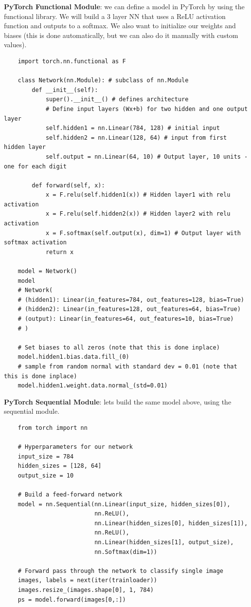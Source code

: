\documentclass[11pt, a4paper]{article}
\begin{document}
\begin{spacing}{1.1}
	\noindent \textbf{PyTorch Functional Module}: we can define a model in PyTorch by using the functional library. We will build a 3 layer NN that uses a ReLU activation function and outputs to a softmax. We also want to initialize our weights and biases (this is done automatically, but we can also do it manually with custom values).
	\begin{lstlisting}
	import torch.nn.functional as F
	
	class Network(nn.Module): # subclass of nn.Module
		def __init__(self):
			super().__init__() # defines architecture
			# Define input layers (Wx+b) for two hidden and one output layer
			self.hidden1 = nn.Linear(784, 128) # initial input
			self.hidden2 = nn.Linear(128, 64) # input from first hidden layer
			self.output = nn.Linear(64, 10) # Output layer, 10 units - one for each digit
		
		def forward(self, x):
			x = F.relu(self.hidden1(x)) # Hidden layer1 with relu activation
			x = F.relu(self.hidden2(x)) # Hidden layer2 with relu activation
			x = F.softmax(self.output(x), dim=1) # Output layer with softmax activation
			return x
	
	model = Network()
	model
	# Network(
	# (hidden1): Linear(in_features=784, out_features=128, bias=True)
	# (hidden2): Linear(in_features=128, out_features=64, bias=True)
	# (output): Linear(in_features=64, out_features=10, bias=True)
	# )
	
	# Set biases to all zeros (note that this is done inplace)
	model.hidden1.bias.data.fill_(0)
	# sample from random normal with standard dev = 0.01 (note that this is done inplace)
	model.hidden1.weight.data.normal_(std=0.01)	
	\end{lstlisting} \vspace*{1mm}
	\textbf{PyTorch Sequential Module}: lets build the same model above, using the sequential module.
	\begin{lstlisting}
	from torch import nn
	
	# Hyperparameters for our network
	input_size = 784
	hidden_sizes = [128, 64]
	output_size = 10
	
	# Build a feed-forward network
	model = nn.Sequential(nn.Linear(input_size, hidden_sizes[0]),
	                      nn.ReLU(),
	                      nn.Linear(hidden_sizes[0], hidden_sizes[1]),
	                      nn.ReLU(),
	                      nn.Linear(hidden_sizes[1], output_size),
	                      nn.Softmax(dim=1))
	                      
	# Forward pass through the network to classify single image
	images, labels = next(iter(trainloader))
	images.resize_(images.shape[0], 1, 784)
	ps = model.forward(images[0,:])
	\end{lstlisting} \newpage


\end{spacing}
\end{document}
